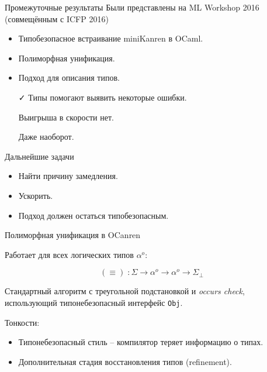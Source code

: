 \documentclass[10pt, mathserif]{beamer}
\newcommand{\oo}[1]{{#1}^o}
\theoremstyle{definition}
\begin{document}
\begin{frame}[fragile]{Промежуточные результаты}
Были представлены на ML Workshop 2016 (совмещённым с ICFP 2016)
\begin{itemize}
\item Типобезопасное встраивание miniKanren в OCaml.
\item Полиморфная унификация.
\item Подход для описания типов.
\end{itemize}

\vspace{2em}
\pause
\begin{enumerate}
 \item[\faCheck] Типы помогают выявить некоторые ошибки.
 \pause
 \item[\faTimes] Выигрыша в скорости нет.
 \item[\faTimes] Даже наоборот.
\end{enumerate}

\end{frame}

\begin{frame}[fragile]{Дальнейшие задачи}
  \begin{itemize}
  \item Найти причину замедления.
  \item Ускорить.
  \item Подход должен остаться типобезопасным.
  \end{itemize}

\end{frame}

\begin{frame}[fragile]{Полиморфная унификация в OCanren}

Работает для всех логических типов  $\oo{\alpha}$:

$$
(\equiv)\;\colon \Sigma\to\oo{\alpha}\to\oo{\alpha}\to\Sigma_{\perp}
$$
\pause

Стандартный алгоритм с треугольной подстановкой и \textit{occurs check}, использующий типонебезопасный интерфейс  \lstinline{Obj}.
\pause

\vspace{3em}
Тонкости:
\begin{itemize}
\item Типонебезопасный стиль -- компилятор теряет информацию о типах.
\item Дополнительная стадия восстановления типов (refinement).
\end{itemize}
\end{frame}
\end{document}
